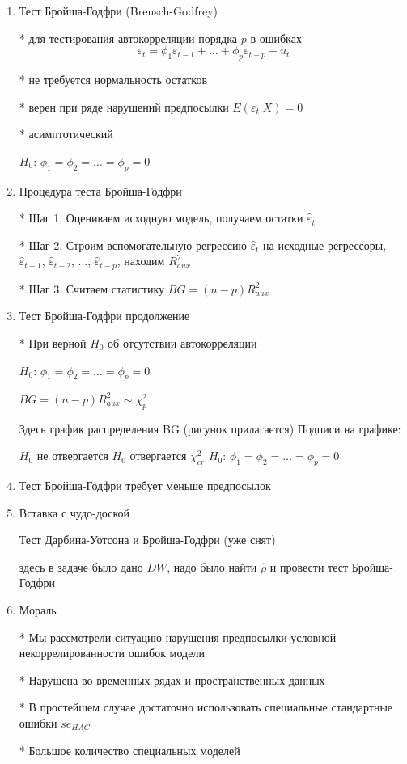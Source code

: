 \documentclass[12pt,a4paper]{article}
\begin{document}
{\begin{enumerate}
\item Тест Бройша-Годфри (Breusch-Godfrey)

* для тестирования автокорреляции порядка $p$ в ошибках
\[
\varepsilon_t=\phi_1 \varepsilon_{t-1} + \ldots + \phi_p \varepsilon_{t-p} + u_t
\]

* не требуется нормальность остатков 

* верен при ряде нарушений предпосылки $E(\varepsilon_t | X)=0$

* асимптотический

$H_0$: $\phi_1=\phi_2=\ldots=\phi_p=0$

\newpage
\item Процедура теста Бройша-Годфри

* Шаг 1. Оцениваем исходную модель, получаем остатки $\hat{\varepsilon}_t$

* Шаг 2. Строим вспомогательную регрессию  $\hat{\varepsilon}_t$ на исходные регрессоры, $\hat{\varepsilon}_{t-1}$, $\hat{\varepsilon}_{t-2}$, ..., $\hat{\varepsilon}_{t-p}$, находим $R^2_{aux}$

* Шаг 3. Считаем статистику $BG=(n-p)R^2_{aux}$

\newpage
\item Тест Бройша-Годфри продолжение

* При верной $H_0$ об отсутствии автокорреляции

$H_0$: $\phi_1=\phi_2=\ldots=\phi_p=0$

$BG=(n-p)R^2_{aux} \sim \chi^2_p$

Здесь график распределения BG (рисунок прилагается)
Подписи на графике:

$H_0$ не отвергается
$H_0$ отвергается
$\chi^2_{cr}$
$H_0$: $\phi_1=\phi_2=\ldots=\phi_p=0$

\newpage 
\item Тест Бройша-Годфри требует меньше предпосылок


\item Вставка с чудо-доской

Тест Дарбина-Уотсона и Бройша-Годфри (уже снят)

здесь в задаче было дано $DW$, надо было найти $\hat{\rho}$ и провести тест Бройша-Годфри

\item Мораль

* Мы рассмотрели ситуацию нарушения предпосылки условной некоррелированности ошибок модели

* Нарушена во временных рядах и пространственных данных
 
* В простейшем случае достаточно использовать специальные стандартные ошибки $se_{HAC}$ 
 
* Большое количество специальных моделей 







 

 




\end{enumerate}





} %
\end{document}
